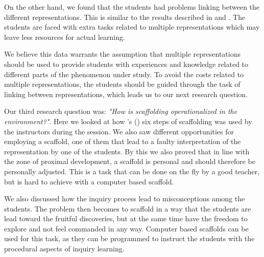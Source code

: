 On the other hand, we found that the students had problems linking between the different representations. This is similar to the results described in \citet{ainsworth1999functions} and \citet{van2006supporting}. The students are faced with extra tasks related to multiple representations which may leave less resources for actual learning. 

We believe this data warrants the assumption that multiple representations should be used to provide students with experiences and knowledge related to different parts of the phenomenon under study. To avoid the costs related to multiple representations, the students should be guided through the task of linking between representations, which leads us to our next research question.






Our third research question was: \emph{"How is scaffolding operationalized in the environment?"}. Here we looked at how \citeauthor{wood1976role}'s (\citeyear{wood1976role}) six steps of scaffolding was used by the instructors during the session. We also saw different opportunities for employing a scaffold, one of them that lead to a faulty interpretation of the representation by one of the students. By this we also proved that in line with the zone of proximal development, a scaffold is personal and should therefore be personally adjusted. This is a task that can be done on the fly by a good teacher, but is hard to achieve with a computer based scaffold. 

We also discussed how the inquiry process lead to misconceptions among the students. The problem then becomes to scaffold in a way that the students are lead toward the fruitful discoveries, but at the same time have the freedom to explore and not feel commanded in any way. Computer based scaffolds can be used for this task, as they can be programmed to instruct the students with the procedural aspects of inquiry learning. 


